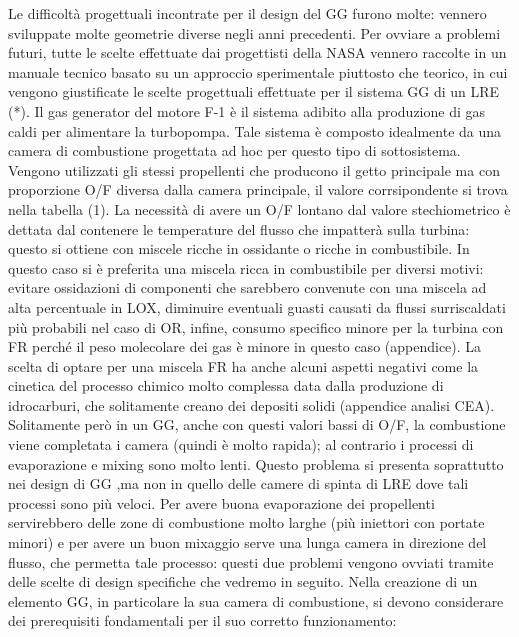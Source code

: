 \documentclass[11pt,a4paper,twocolumn]{article}
\begin{document}
\label{sec:gas generator}
Le difficoltà progettuali incontrate per il design del GG furono molte: vennero sviluppate molte geometrie diverse negli anni precedenti. Per ovviare a problemi futuri, tutte le scelte effettuate dai progettisti della NASA vennero raccolte in un manuale tecnico basato su un approccio sperimentale piuttosto che teorico, in cui vengono giustificate le scelte progettuali effettuate per il sistema GG di un LRE (*).
Il gas generator del motore F-1 è il sistema adibito alla produzione di gas caldi per alimentare la turbopompa. Tale sistema è composto idealmente da una camera di combustione progettata ad hoc per questo tipo di sottosistema. Vengono utilizzati gli stessi propellenti che producono il getto principale ma con proporzione O/F diversa dalla camera principale, il valore corrsipondente si trova nella tabella (1). La necessità di avere un O/F lontano dal valore stechiometrico è dettata dal contenere le temperature del flusso che impatterà sulla turbina: questo si ottiene con miscele ricche in ossidante o ricche in combustibile. In questo caso si è preferita una miscela ricca in combustibile per diversi motivi: evitare ossidazioni di componenti che sarebbero convenute con una miscela ad alta percentuale in LOX, diminuire eventuali guasti causati da flussi surriscaldati più probabili nel caso di OR, infine, consumo specifico minore per la turbina con FR perché il peso molecolare dei gas è minore in questo caso (appendice). La scelta di optare per una miscela FR ha anche alcuni aspetti negativi come la cinetica del processo chimico molto complessa data dalla produzione di idrocarburi, che solitamente creano dei depositi solidi (appendice analisi CEA). Solitamente però in un GG, anche con questi valori bassi di O/F,  la combustione viene completata i camera (quindi è molto rapida); al contrario i processi di evaporazione e mixing sono molto lenti. Questo problema si presenta soprattutto nei design di GG ,ma non in quello delle camere di spinta di LRE dove tali processi sono più veloci. Per avere buona evaporazione dei propellenti servirebbero delle zone di combustione molto larghe (più iniettori con portate minori) e per avere un buon mixaggio serve una lunga camera in direzione del flusso, che permetta tale processo: questi due problemi vengono ovviati tramite delle scelte di design specifiche che vedremo in seguito. 
Nella creazione di un elemento GG, in particolare la sua camera di combustione, si devono considerare dei prerequisiti fondamentali per il suo corretto funzionamento:
\end{document}
